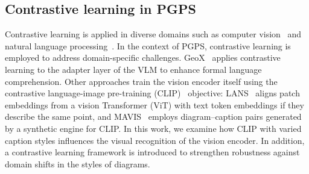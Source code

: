 \subsection{Contrastive learning in PGPS}

Contrastive learning is applied in diverse domains such as computer vision~\citep{facenet} and natural language processing~\citep{simcse}. 
In the context of PGPS, contrastive learning is employed to address domain-specific challenges. GeoX~\citep{geox} applies contrastive learning to the adapter layer of the VLM to enhance formal language comprehension. Other approaches train the vision encoder itself using the contrastive language-image pre-training (CLIP)~\citep{clip} objective: LANS~\citep{LANS} aligns patch embeddings from a vision Transformer (ViT) with text token embeddings if they describe the same point, and MAVIS~\citep{mavis} employs diagram–caption pairs generated by a synthetic engine for CLIP.
In this work, we examine how CLIP with varied caption styles influences the visual \geofeat{} recognition of the vision encoder. In addition, a contrastive learning framework is introduced to strengthen robustness against domain shifts in the styles of diagrams.


